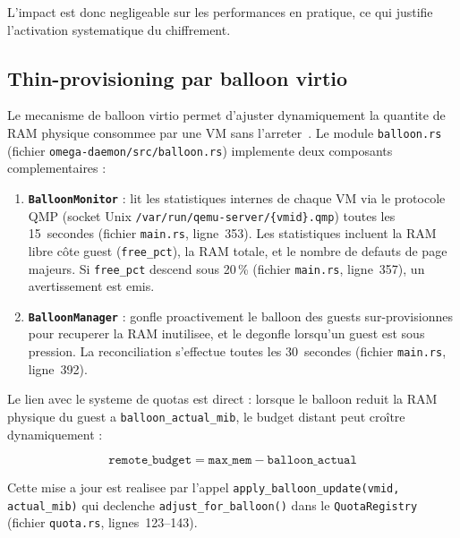 L'impact est donc negligeable sur les performances en pratique, ce qui justifie l'activation systematique du chiffrement.

\subsection{Thin-provisioning par balloon virtio}
\label{subsec:balloon}

Le mecanisme de balloon virtio permet d'ajuster dynamiquement la quantite de RAM physique consommee par une VM sans l'arreter~\cite{qemu_balloon,waldspurger_2002}. Le module \texttt{balloon.rs} (fichier \texttt{omega-daemon/src/balloon.rs}) implemente deux composants complementaires :

\begin{enumerate}
    \item \textbf{\texttt{BalloonMonitor}} : lit les statistiques internes de chaque VM via le protocole QMP (socket Unix \texttt{/var/run/qemu-server/\{vmid\}.qmp}) toutes les 15~secondes (fichier \texttt{main.rs}, ligne~353). Les statistiques incluent la RAM libre c\^ote guest (\texttt{free\_pct}), la RAM totale, et le nombre de defauts de page majeurs. Si \texttt{free\_pct} descend sous 20\,\% (fichier \texttt{main.rs}, ligne~357), un avertissement est emis.

    \item \textbf{\texttt{BalloonManager}} : gonfle proactivement le balloon des guests sur-provisionnes pour recuperer la RAM inutilisee, et le degonfle lorsqu'un guest est sous pression. La reconciliation s'effectue toutes les 30~secondes (fichier \texttt{main.rs}, ligne~392).
\end{enumerate}

Le lien avec le systeme de quotas est direct : lorsque le balloon reduit la RAM physique du guest a \texttt{balloon\_actual\_mib}, le budget distant peut croître dynamiquement :

\begin{equation}
    \label{eq:balloon-quota}
    \texttt{remote\_budget} = \texttt{max\_mem} - \texttt{balloon\_actual}
\end{equation}

Cette mise a jour est realisee par l'appel \texttt{apply\_balloon\_update(vmid, actual\_mib)} qui declenche \texttt{adjust\_for\_balloon()} dans le \texttt{QuotaRegistry} (fichier \texttt{quota.rs}, lignes~123--143).


